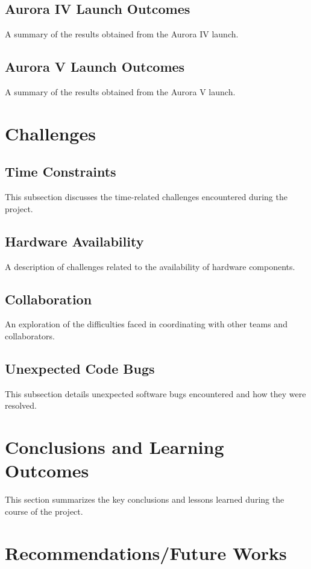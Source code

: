 \subsection{Aurora IV Launch Outcomes}
A summary of the results obtained from the Aurora IV launch.

\subsection{Aurora V Launch Outcomes}
A summary of the results obtained from the Aurora V launch.

\section{Challenges}
\subsection{Time Constraints}
This subsection discusses the time-related challenges encountered during the project.

\subsection{Hardware Availability}
A description of challenges related to the availability of hardware components.

\subsection{Collaboration}
An exploration of the difficulties faced in coordinating with other teams and collaborators.

\subsection{Unexpected Code Bugs}
This subsection details unexpected software bugs encountered and how they were resolved.

\section{Conclusions and Learning Outcomes}
This section summarizes the key conclusions and lessons learned during the course of the project.

\section{Recommendations/Future Works}
